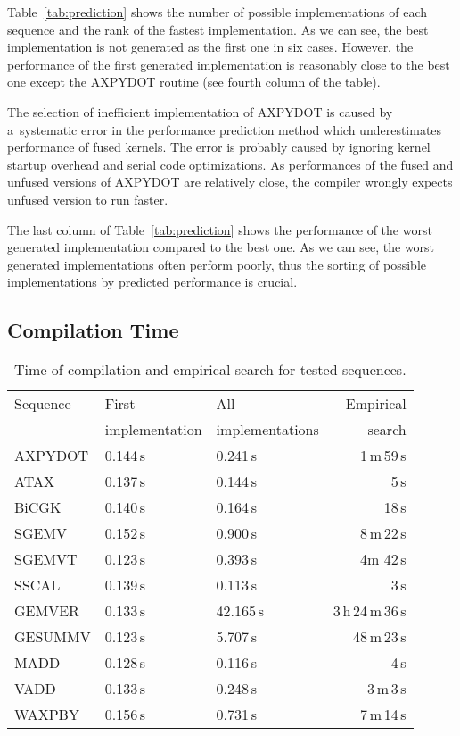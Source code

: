 \documentclass[final]{siamltex}
\begin{document}
{Table~\ref{tab:prediction} shows the number of possible implementations of each sequence and the rank of the fastest implementation. As we can see, the best implementation is not generated as the first one in six cases. However, the performance of the first generated implementation is reasonably close to the best one except the AXPYDOT routine (see fourth column of the table).

The selection of inefficient implementation of AXPYDOT is caused by a~systematic error in the performance prediction method which underestimates performance of fused kernels. The error is probably caused by ignoring kernel startup overhead and serial code optimizations. As performances of the fused and unfused versions of AXPYDOT are relatively close, the compiler wrongly expects unfused version to run faster.


The last column of Table~\ref{tab:prediction} shows the performance of the worst generated implementation compared to the best one. As we can see, the worst generated implementations often perform poorly, thus the sorting of possible implementations by predicted performance is crucial.





\subsection{Compilation Time}

\begin{table}
        \centering
        \small
        \begin{tabular}{|l|l|l|r|}
                \hline
                Sequence & First           & All             & Empirical  \\
                         & implementation  & implementations & search     \\
                \hline
                AXPYDOT  & 0.144\,s & 0.241\,s & 1\,m\,59\,s\\
                ATAX     & 0.137\,s & 0.144\,s & 5\,s\\
                BiCGK    & 0.140\,s & 0.164\,s & 18\,s\\
                SGEMV    & 0.152\,s & 0.900\,s & 8\,m\,22\,s\\
                SGEMVT   & 0.123\,s & 0.393\,s & 4m\,\,42\,s\\
                SSCAL    & 0.139\,s & 0.113\,s & 3\,s\\
                GEMVER   & 0.133\,s & 42.165\,s & 3\,h\,24\,m\,36\,s\\
                GESUMMV  & 0.123\,s & 5.707\,s & 48\,m\,23\,s\\
                MADD     & 0.128\,s & 0.116\,s & 4\,s\\
                VADD     & 0.133\,s & 0.248\,s & 3\,m\,3\,s\\
                WAXPBY   & 0.156\,s & 0.731\,s & 7\,m\,14\,s\\
                \hline
        \end{tabular}
        \caption{Time of compilation and empirical search for tested sequences.}
        \label{tab:fublas_comp_timing}
\end{table}

}
\end{document}
